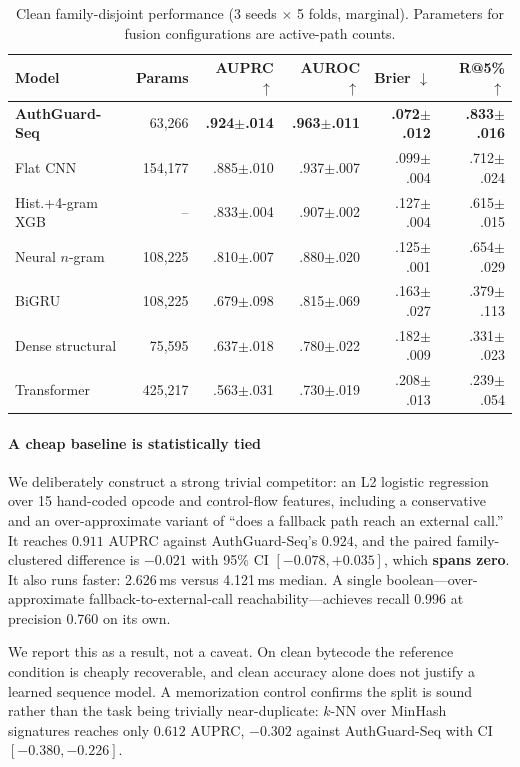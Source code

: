 \documentclass[conference]{IEEEtran}
\begin{document}
\begin{table}[t]
\centering
\caption{Clean family-disjoint performance (3 seeds $\times$ 5 folds, marginal). Parameters for fusion configurations are active-path counts.}
\label{tab:clean}
\scriptsize
\setlength{\tabcolsep}{3pt}
\begin{tabular}{@{}lrrrrr@{}}
\toprule
Model & Params & AUPRC $\uparrow$ & AUROC $\uparrow$ & Brier $\downarrow$ & R@5\% $\uparrow$ \\
\midrule
\textbf{AuthGuard-Seq} & 63{,}266 & \textbf{.924$\pm$.014} & \textbf{.963$\pm$.011} & \textbf{.072$\pm$.012} & \textbf{.833$\pm$.016} \\
Flat CNN & 154{,}177 & .885$\pm$.010 & .937$\pm$.007 & .099$\pm$.004 & .712$\pm$.024 \\
Hist.+4-gram XGB & -- & .833$\pm$.004 & .907$\pm$.002 & .127$\pm$.004 & .615$\pm$.015 \\
Neural $n$-gram & 108{,}225 & .810$\pm$.007 & .880$\pm$.020 & .125$\pm$.001 & .654$\pm$.029 \\
BiGRU & 108{,}225 & .679$\pm$.098 & .815$\pm$.069 & .163$\pm$.027 & .379$\pm$.113 \\
Dense structural & 75{,}595 & .637$\pm$.018 & .780$\pm$.022 & .182$\pm$.009 & .331$\pm$.023 \\
Transformer & 425{,}217 & .563$\pm$.031 & .730$\pm$.019 & .208$\pm$.013 & .239$\pm$.054 \\
\bottomrule
\end{tabular}
\end{table}

\paragraph*{A cheap baseline is statistically tied} We deliberately construct a strong trivial competitor: an L2 logistic regression over 15 hand-coded opcode and control-flow features, including a conservative and an over-approximate variant of ``does a fallback path reach an external call.'' It reaches $0.911$ AUPRC against AuthGuard-Seq's $0.924$, and the paired family-clustered difference is $-0.021$ with 95\% CI $[-0.078,+0.035]$, which \textbf{spans zero}. It also runs faster: 2.626\,ms versus 4.121\,ms median. A single boolean---over-approximate fallback-to-external-call reachability---achieves recall 0.996 at precision 0.760 on its own.

We report this as a result, not a caveat. On clean bytecode the reference condition is cheaply recoverable, and clean accuracy alone does not justify a learned sequence model. A memorization control confirms the split is sound rather than the task being trivially near-duplicate: $k$-NN over MinHash signatures reaches only $0.612$ AUPRC, $-0.302$ against AuthGuard-Seq with CI $[-0.380,-0.226]$.
\end{document}
